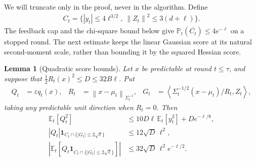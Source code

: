 \documentclass{article}
\newtheorem{lemma}[lemma]{Lemma}
\newcommand{\E}{\mathbb E}
\newcommand{\Pp}{\mathbb P}
\newcommand{\1}{\mathbf 1}
\newcommand{\eps}{\varepsilon}
\newcommand{\ip}[2]{\left\langle #1,#2\right\rangle}
\newcommand{\norm}[1]{\left\lVert #1\right\rVert}
\newcommand{\normm}[2]{\left\lVert #1\right\rVert_{#2}}
\begin{document}
We will truncate only in the proof, never in the algorithm. Define
\begin{align}
    C_t=\{|y_t|\leq4\ell^{3/2},\ \norm{Z_t}^2\leq3(d+\ell)\}.
    \label{eq:common-truncation}
\end{align}
The feedback cap and the chi-square bound below give
$\Pp_t(\overline{C_t})\leq4e^{-\ell}$ on a stopped round.
The next estimate keeps the linear Gaussian score at its natural
second-moment scale, rather than bounding it by the squared Hessian score.
\begin{lemma}[Quadratic score bounds]
    \label{lem:quadratic-score-bounds}
    Let $x$ be predictable at round $t\leq\tau$, and suppose that
    $\frac12R_t(x)^2\leq D\leq32B\ell$. Put
    \begin{align}
        Q_t & =\eps q_t(x),
            & R_t           & =\normm{x-\mu_t}{\Sigma_t^{-1}},
            & G_t           & =\ip{\Sigma_t^{-1/2}(x-\mu_t)/R_t}{Z_t},
    \end{align}
    taking any predictable unit direction when $R_t=0$. Then
    \begin{align}
        \E_t[Q_t^2]
         & \leq10D\ell\,\E_t[y_t^2]+De^{-\ell/8},
        \label{eq:q-predictable-second-moment}
        \\
        |Q_t|\1_{C_t\cap\{|G_t|\leq2\sqrt\ell\}}
         & \leq12\sqrt D\,\ell^2,
        \label{eq:q-score-bound}
        \\
        \left|\E_t\left[Q_t\1_{\overline{C_t\cap\{|G_t|\leq2\sqrt\ell\}}}\right]\right|
         & \leq32\sqrt D\,\ell^2 e^{-\ell/2}.
        \label{eq:q-truncation-bias}
    \end{align}
\end{lemma}
\end{document}
